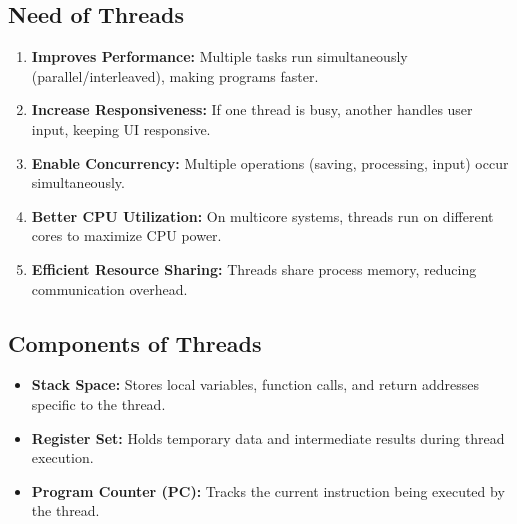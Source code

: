 \documentclass[10pt,a4paper]{article}
\begin{document}
\begin{center}
\end{center}

\subsection{Need of Threads}
\begin{enumerate}
    \item \textbf{Improves Performance:} Multiple tasks run simultaneously (parallel/interleaved), making programs faster.
    \item \textbf{Increase Responsiveness:} If one thread is busy, another handles user input, keeping UI responsive.
    \item \textbf{Enable Concurrency:} Multiple operations (saving, processing, input) occur simultaneously.
    \item \textbf{Better CPU Utilization:} On multicore systems, threads run on different cores to maximize CPU power.
    \item \textbf{Efficient Resource Sharing:} Threads share process memory, reducing communication overhead.
\end{enumerate}

\subsection{Components of Threads}
\begin{itemize}
    \item \textbf{Stack Space:} Stores local variables, function calls, and return addresses specific to the thread.
    \item \textbf{Register Set:} Holds temporary data and intermediate results during thread execution.
    \item \textbf{Program Counter (PC):} Tracks the current instruction being executed by the thread.
\end{itemize}
\end{document}
